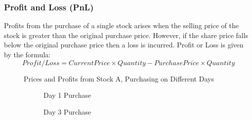\documentclass[a4paper,12pt]{report}
\numberwithin{equation}{section}
\theoremstyle{definition}
\begin{document}
\subsubsection{Profit and Loss (PnL)}
Profits from the purchase of a single stock arises when the selling price of the stock is greater than the original purchase price. However, if the share price falls below the original purchase price then a loss is incurred. Profit or Loss is given by the formula: 
\begin{equation*}
  Profit/Loss = Current Price \times Quantity - Purchase Price \times Quantity
\end{equation*}

\datatable
{}\datatable
\begin{figure}[H]
  \centering
  \centerline{Prices and Profits from Stock A, Purchasing on Different Days}
  \par\medskip
  \begin{subfigure}{.475\linewidth}
    \centering
  \caption{Day 1 Purchase}
  \label{graph: prices_and_profits}
\end{subfigure}%
\hfill%
\begin{subfigure}{.475\linewidth}
  \centering
    \caption{Day 3 Purchase}
    \label{graph: prices_and_profits2}
  \end{subfigure}
  \caption{}
  \label{figure: prices_and_profits_main}
\end{figure}
\end{document}
